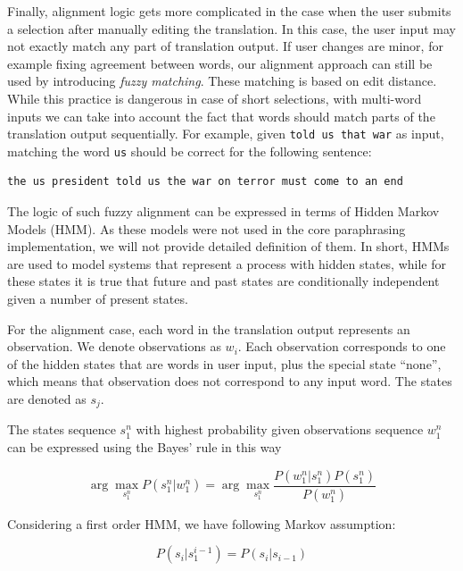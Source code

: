 Finally, alignment logic gets more complicated in the case when the user submits a selection after manually editing the translation. In this case, the user input may not exactly match any part of translation output. If user changes are minor, for example fixing agreement between words, our alignment approach can still be used by introducing \emph{fuzzy matching}. These matching is based on edit distance. While this practice is dangerous in case of short selections, with multi-word inputs we can take into account the fact that words should match parts of the translation output sequentially. For example, given \texttt{told us that war} as input, matching the word \texttt{us} should be correct for the following sentence: 

\begin{verbatim}
the us president told us the war on terror must come to an end
\end{verbatim}

The logic of such fuzzy alignment can be expressed in terms of Hidden Markov Models (HMM). As these models were not used in the core paraphrasing implementation, we will not provide detailed definition of them. In short, HMMs are used to model systems that represent a process with hidden states, while for these states it is true that future and past states are conditionally independent given a number of present states.

For the alignment case, each word in the translation output represents an observation. We denote observations as $w_{i}$. Each observation corresponds to one of the hidden states that are words in user input, plus the special state ``none'', which means that observation does not correspond to any input word. The states are denoted as $s_{j}$. 

\begin{center}
The states sequence $s_{1}^{n}$ with highest probability given observations sequence $w_{1}^{n}$ can be expressed using the Bayes' rule in this way 
\end{center}
\begin{large}
\begin{equation}
\arg \max_{s_{1}^{n}} P(s_{1}^{n}|w_{1}^{n}) = \arg \max_{s_{1}^{n}} \frac{P(w_{1}^{n}|s_{1}^{n})P(s_{1}^{n})}{P(w_{1}^{n})}
\end{equation}
\end{large}

\begin{center}
Considering a first order HMM, we have following Markov assumption:
\end{center}
\begin{large}
\begin{equation}
P(s_{i}|s_{1}^{i-1}) = P(s_{i}|s_{i-1})
\end{equation}
\end{large}

